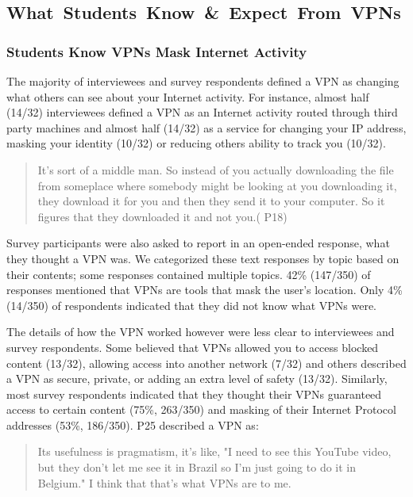 \subsection{\mbox{What Students Know \& Expect From VPNs}}

\subsubsection{Students Know VPNs Mask Internet Activity}

The majority of interviewees and survey respondents defined a VPN as changing what others can see about your Internet activity. For instance, almost half (14/32) interviewees defined a VPN as an
Internet activity routed through third party machines and almost half (14/32) as a service for changing your IP
address, masking your identity (10/32) or reducing others ability to track
you (10/32).  \begin{quote}It's sort of a middle man. So instead of you actually
downloading the file from someplace where somebody might be looking at you
downloading it, they download it for you and then they send it to your
computer. So it figures that they downloaded it and not you.( P18)\end{quote}

Survey participants were also asked to report in an open-ended response, what they
thought a VPN was. We categorized these text responses by topic based on their
contents; some responses contained multiple topics.   42\% (147/350) of
responses mentioned that VPNs are tools that mask the user’s location. Only
4\% (14/350) of respondents indicated that they did not know what VPNs were.

The details of how the VPN worked however were less clear to interviewees and survey respondents. Some believed that VPNs allowed you to  access blocked content (13/32), allowing access into another network (7/32) and others described a VPN as secure,  private, or adding an extra level of safety (13/32). Similarly, most survey respondents indicated that they thought their VPNs guaranteed access to certain content
 (75\%, 263/350) and masking of their Internet Protocol addresses (53\%, 186/350). P25 described a VPN as:
\begin{quote} Its usefulness is pragmatism, it's like, "I need to see this YouTube video, but they don't let me see it in Brazil so I'm just going to do it
    in Belgium." I think that that's what VPNs are to me. \end{quote}
    
